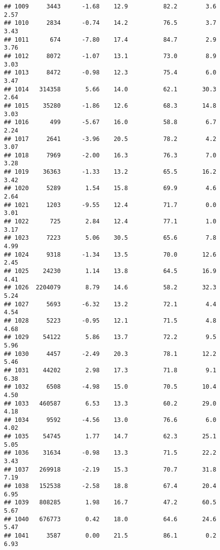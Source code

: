 \documentclass[
]{article}
\begin{document}
\begin{verbatim}
## 1009     3443      -1.68    12.9          82.2        3.6              2.57
## 1010     2834      -0.74    14.2          76.5        3.7              3.43
## 1011      674      -7.80    17.4          84.7        2.9              3.76
## 1012     8072      -1.07    13.1          73.0        8.9              3.03
## 1013     8472      -0.98    12.3          75.4        6.0              3.47
## 1014   314358       5.66    14.0          62.1       30.3              2.64
## 1015    35280      -1.86    12.6          68.3       14.8              3.03
## 1016      499      -5.67    16.0          58.8        6.7              2.24
## 1017     2641      -3.96    20.5          78.2        4.2              3.07
## 1018     7969      -2.00    16.3          76.3        7.0              3.28
## 1019    36363      -1.33    13.2          65.5       16.2              3.42
## 1020     5289       1.54    15.8          69.9        4.6              2.64
## 1021     1203      -9.55    12.4          71.7        0.0              3.01
## 1022      725       2.84    12.4          77.1        1.0              3.17
## 1023     7223       5.06    30.5          65.6        7.8              4.99
## 1024     9318      -1.34    13.5          70.0       12.6              2.45
## 1025    24230       1.14    13.8          64.5       16.9              4.41
## 1026  2204079       8.79    14.6          58.2       32.3              5.24
## 1027     5693      -6.32    13.2          72.1        4.4              4.54
## 1028     5223      -0.95    12.1          71.5        4.8              4.68
## 1029    54122       5.86    13.7          72.2        9.5              5.96
## 1030     4457      -2.49    20.3          78.1       12.2              5.46
## 1031    44202       2.98    17.3          71.8        9.1              6.38
## 1032     6508      -4.98    15.0          70.5       10.4              4.50
## 1033   460587       6.53    13.3          60.2       29.0              4.18
## 1034     9592      -4.56    13.0          76.6        6.0              4.02
## 1035    54745       1.77    14.7          62.3       25.1              5.05
## 1036    31634      -0.98    13.3          71.5       22.2              3.43
## 1037   269918      -2.19    15.3          70.7       31.8              7.19
## 1038   152538      -2.58    18.8          67.4       20.4              6.95
## 1039   808285       1.98    16.7          47.2       60.5              5.67
## 1040   676773       0.42    18.0          64.6       24.6              5.47
## 1041     3587       0.00    21.5          86.1        0.2              6.93

\end{verbatim}
\end{document}
